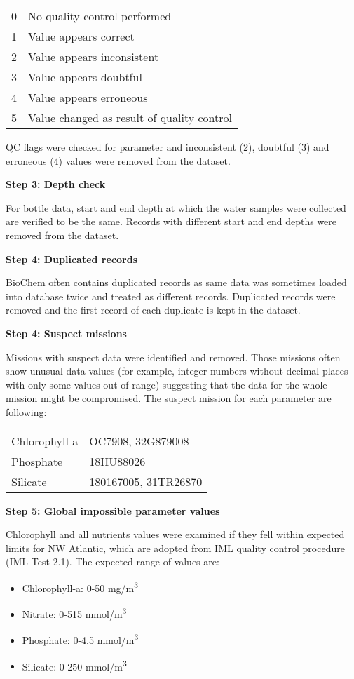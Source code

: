 \documentclass[letterpaper,portrait,11pt]{scrartcl}
\numberwithin{equation}{section}		%
\numberwithin{figure}{section}		%
\numberwithin{table}{section}				%
\begin{document}
\begin{appendices}
\begin{table} [h]
\begin{tabular}{ll}
0 & No quality control performed \\
1 & Value appears correct \\
2 & Value appears inconsistent \\
3 & Value appears doubtful \\
4 & Value  appears erroneous \\
5 & Value changed as result of quality control \\
\end{tabular}
\end{table}

QC flags were checked for parameter and inconsistent (2), doubtful (3) and erroneous (4) values were removed from the dataset.

\textbf{Step 3: Depth check}

For bottle data, start and end depth at which the water samples were collected are verified to be the same. Records with different start and end depths were removed from the dataset.

\textbf{Step 4: Duplicated records}

BioChem often contains duplicated records as same data was sometimes loaded into database twice and treated as different records. Duplicated records were removed and the first record of each duplicate is kept in the dataset.

\textbf{Step 4: Suspect missions}

Missions with suspect data were identified and removed. Those missions often show unusual data values (for example, integer numbers without decimal places with only some values out of range) suggesting that the data for the whole mission might be compromised. The suspect mission for each parameter are following:

\begin{table} [h]
  \begin{tabular}{ll}
	Chlorophyll-a & OC7908, 32G879008 \\
  Phosphate & 18HU88026 \\
  Silicate & 180167005, 31TR26870 \\
  \end{tabular}
\end{table}


\textbf{Step 5: Global impossible parameter values}

Chlorophyll and all nutrients values were examined if they fell within expected limits for NW Atlantic, which are adopted from IML quality control procedure (IML Test 2.1). The expected range of values are:
\begin{itemize}
  \item Chlorophyll-a: 0-50 mg/m\textsuperscript{3}
  \item Nitrate: 0-515 mmol/m\textsuperscript{3}
  \item Phosphate: 0-4.5 mmol/m\textsuperscript{3}
  \item Silicate: 0-250 mmol/m\textsuperscript{3}
\end{itemize}


\end{appendices}
\end{document}
